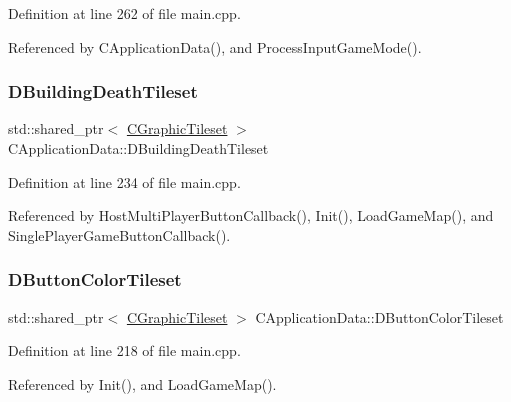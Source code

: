 Definition at line 262 of file main.\+cpp.



Referenced by C\+Application\+Data(), and Process\+Input\+Game\+Mode().

\hypertarget{classCApplicationData_ab463f816076fec8d43ecfe61120e8e6b}{}\label{classCApplicationData_ab463f816076fec8d43ecfe61120e8e6b} 
\subsubsection{\texorpdfstring{D\+Building\+Death\+Tileset}{DBuildingDeathTileset}}
{\footnotesize\ttfamily std\+::shared\+\_\+ptr$<$ \hyperlink{classCGraphicTileset}{C\+Graphic\+Tileset} $>$ C\+Application\+Data\+::\+D\+Building\+Death\+Tileset\hspace{0.3cm}{\ttfamily [protected]}}



Definition at line 234 of file main.\+cpp.



Referenced by Host\+Multi\+Player\+Button\+Callback(), Init(), Load\+Game\+Map(), and Single\+Player\+Game\+Button\+Callback().

\hypertarget{classCApplicationData_a7482e0b4d7e0ce4979eb9f28872023ad}{}\label{classCApplicationData_a7482e0b4d7e0ce4979eb9f28872023ad} 
\subsubsection{\texorpdfstring{D\+Button\+Color\+Tileset}{DButtonColorTileset}}
{\footnotesize\ttfamily std\+::shared\+\_\+ptr$<$ \hyperlink{classCGraphicTileset}{C\+Graphic\+Tileset} $>$ C\+Application\+Data\+::\+D\+Button\+Color\+Tileset\hspace{0.3cm}{\ttfamily [protected]}}



Definition at line 218 of file main.\+cpp.



Referenced by Init(), and Load\+Game\+Map().

\hypertarget{classCApplicationData_ac983034ed6e3eec382e22f1d2af25106}{}\label{classCApplicationData_ac983034ed6e3eec382e22f1d2af25106} 
